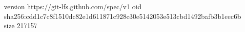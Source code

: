 version https://git-lfs.github.com/spec/v1
oid sha256:cdd1c7c8f1510dc82e1d611871c928c30e5142053e513cbd1492bafb3b1eec6b
size 217157
